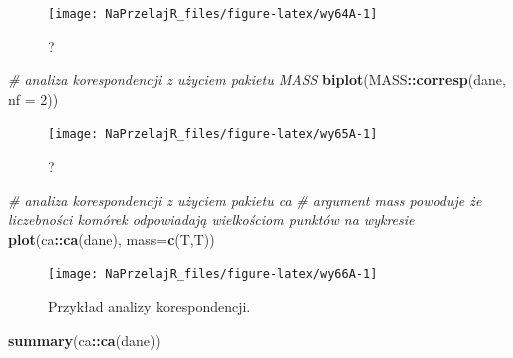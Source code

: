 \documentclass[polish,]{book}
\newenvironment{Shaded}{\begin{snugshade}}{\end{snugshade}}
\newcommand{\CommentTok}[1]{\textcolor[rgb]{0.56,0.35,0.01}{\textit{#1}}}
\newcommand{\DataTypeTok}[1]{\textcolor[rgb]{0.13,0.29,0.53}{#1}}
\newcommand{\DecValTok}[1]{\textcolor[rgb]{0.00,0.00,0.81}{#1}}
\newcommand{\KeywordTok}[1]{\textcolor[rgb]{0.13,0.29,0.53}{\textbf{#1}}}
\newcommand{\NormalTok}[1]{#1}
\newcommand{\OperatorTok}[1]{\textcolor[rgb]{0.81,0.36,0.00}{\textbf{#1}}}
\begin{document}
\begin{figure}[h]

{\centering \texttt{[image: NaPrzelajR\_files/figure-latex/wy64A-1]} 

}

\caption{?}\label{fig:wy64A}
\end{figure}

\begin{Shaded}
\begin{Highlighting}[]
\CommentTok{# analiza korespondencji z użyciem pakietu MASS}
\KeywordTok{biplot}\NormalTok{(MASS}\OperatorTok{::}\KeywordTok{corresp}\NormalTok{(dane, }\DataTypeTok{nf =} \DecValTok{2}\NormalTok{))}
\end{Highlighting}
\end{Shaded}

\begin{figure}[h]

{\centering \texttt{[image: NaPrzelajR\_files/figure-latex/wy65A-1]} 

}

\caption{?}\label{fig:wy65A}
\end{figure}

\begin{Shaded}
\begin{Highlighting}[]
\CommentTok{# analiza korespondencji z użyciem pakietu ca}
\CommentTok{# argument mass powoduje że liczebności komórek odpowiadają wielkościom punktów na wykresie}
\KeywordTok{plot}\NormalTok{(ca}\OperatorTok{::}\KeywordTok{ca}\NormalTok{(dane), }\DataTypeTok{mass=}\KeywordTok{c}\NormalTok{(T,T))}
\end{Highlighting}
\end{Shaded}

\begin{figure}[h]

{\centering \texttt{[image: NaPrzelajR\_files/figure-latex/wy66A-1]} 

}

\caption{Przykład analizy korespondencji.}\label{fig:wy66A}
\end{figure}

\begin{Shaded}
\begin{Highlighting}[]
\KeywordTok{summary}\NormalTok{(ca}\OperatorTok{::}\KeywordTok{ca}\NormalTok{(dane))}
\end{Highlighting}
\end{Shaded}
\end{document}
